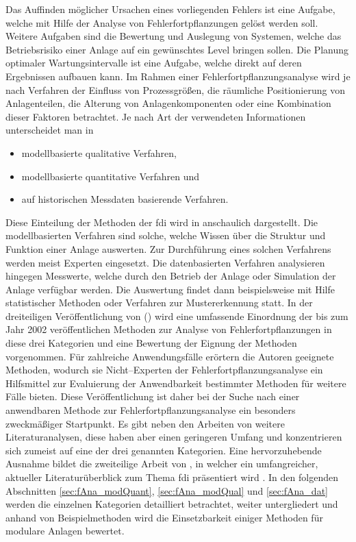 Das Auffinden m\"oglicher Ursachen eines vorliegenden Fehlers ist eine Aufgabe, welche mit Hilfe der Analyse von Fehlerfortpflanzungen gel\"ost werden soll. Weitere Aufgaben sind die Bewertung und Auslegung von Systemen, welche das Betriebsrisiko einer Anlage auf ein gew\"unschtes Level bringen sollen. Die Planung optimaler Wartungsintervalle ist eine Aufgabe, welche direkt auf deren Ergebnissen aufbauen kann. \newline
Im Rahmen einer Fehlerfortpflanzungsanalyse wird je nach Verfahren der Einfluss von Prozessgr\"o\ss{}en, die r\"aumliche Positionierung von Anlagenteilen, die Alterung von Anlagenkomponenten oder eine Kombination dieser Faktoren betrachtet. Je nach Art der verwendeten Informationen unterscheidet man in \begin{itemize}
\item modellbasierte qualitative Verfahren,
\item modellbasierte quantitative Verfahren und 
\item auf historischen Messdaten basierende Verfahren. 
\end{itemize}
Diese Einteilung der Methoden der \ac{fdi} wird in  anschaulich dargestellt. Die modellbasierten Verfahren sind solche, welche Wissen \"uber die Struktur und Funktion einer Anlage auswerten. Zur Durchf\"uhrung eines solchen Verfahrens werden meist Experten eingesetzt. Die datenbasierten Verfahren analysieren hingegen Messwerte, welche durch den Betrieb der Anlage oder Simulation der Anlage verf\"ugbar werden. Die Auswertung findet dann beispielsweise mit Hilfe statistischer Methoden oder Verfahren zur Mustererkennung statt. \newline
In der dreiteiligen Ver\"offentlichung von \citeauthor{Venkatasubramanian_2003} (\cite{Venkatasubramanian_2003, Venkatasubramanian_2003a,Venkatasubramanian_2003b}) wird eine umfassende Einordnung der bis zum Jahr 2002 ver\"offentlichen Methoden zur Analyse von Fehlerfortpflanzungen in diese drei Kategorien und eine Bewertung der Eignung der Methoden vorgenommen. F\"ur zahlreiche Anwendungsf\"alle er\"ortern die Autoren geeignete Methoden, wodurch sie {Nicht--Ex}perten der Fehlerfortpflanzungsanalyse ein Hilfsmittel zur Evaluierung der Anwendbarkeit bestimmter Methoden f\"ur weitere F\"alle bieten. Diese Ver\"offentlichung ist daher bei der Suche nach einer anwendbaren Methode zur Fehlerfortpflanzungsanalyse ein besonders zweckm\"a\ss{}iger Startpunkt. Es gibt neben den Arbeiten von \citeauthor{Venkatasubramanian_2003} weitere Literaturanalysen, diese haben aber einen geringeren Umfang und konzentrieren sich zumeist auf eine der drei genannten Kategorien. Eine hervorzuhebende Ausnahme bildet die zweiteilige Arbeit von \citeauthor{Gao_2015}, in welcher ein umfangreicher, aktueller Literatur\"uberblick zum Thema \ac{fdi} pr\"asentiert wird \cite{Gao_2015,Gao_2015a}. \newline
In den folgenden Abschnitten \ref{sec:fAna_modQuant}, \ref{sec:fAna_modQual} und \ref{sec:fAna_dat} werden die einzelnen Kategorien detailliert betrachtet, weiter untergliedert und anhand von Beispielmethoden wird die Einsetzbarkeit einiger Methoden f\"ur modulare Anlagen bewertet. 

